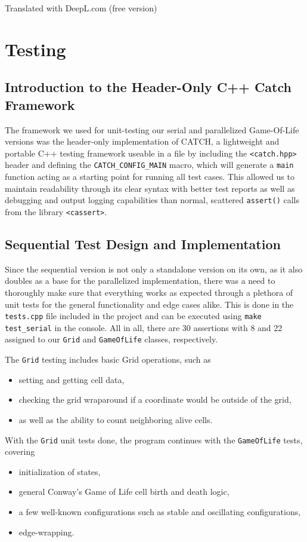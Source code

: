 \documentclass[11pt]{article}
\begin{document}
Translated with DeepL.com (free version)

\section{Testing}

\subsection{Introduction to the Header-Only C++ Catch Framework}
The framework we used for unit-testing our serial and parallelized Game-Of-Life versions was the header-only implementation of CATCH, a lightweight and portable C++ testing framework useable in a file by including the \texttt{<catch.hpp>} header and defining the \texttt{CATCH\_CONFIG\_MAIN} macro, which will generate a \texttt{main} function acting as a starting point for running all test cases. This allowed us to maintain readability through its clear syntax with better test reports as well as debugging and output logging capabilities than normal, scattered \texttt{assert()} calls from the library \texttt{<cassert>}.

\subsection{Sequential Test Design and Implementation}
Since the sequential version is not only a standalone version on its own, as it also doubles as a base for the parallelized implementation, there was a need to thoroughly make sure that everything works as expected through a plethora of unit tests for the general functionality and edge cases alike. This is done in the \texttt{tests.cpp} file included in the project and can be executed using \texttt{make test\_serial} in the console. All in all, there are 30 assertions with 8 and 22 assigned to our \texttt{Grid} and \texttt{GameOfLife} classes, respectively.

The \texttt{Grid} testing includes basic Grid operations, such as 
\begin{itemize}
    \item setting and getting cell data,
    \item checking the grid wraparound if a coordinate would be outside of the grid,
    \item as well as the ability to count neighboring alive cells.
\end{itemize}

With the \texttt{Grid} unit tests done, the program continues with the \texttt{GameOfLife} tests, covering
\begin{itemize}
    \item initialization of states,
    \item general Conway’s Game of Life cell birth and death logic,
    \item a few well-known configurations such as stable and oscillating configurations,
    \item edge-wrapping.
\end{itemize}
\end{document}
